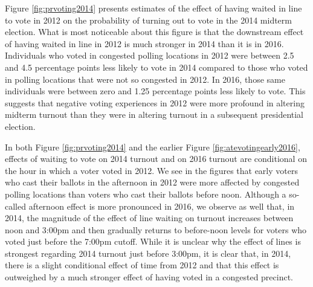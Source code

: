 \documentclass[12pt,titlepage]{article}
\begin{document}
Figure \ref{fig:prvoting2014} presents estimates of the effect of
having waited in line to vote in 2012 on the probability of turning
out to vote in the 2014 midterm election. What is most noticeable
about this figure is that the downstream effect of having waited in
line in 2012 is much stronger in 2014 than it is in 2016. Individuals
who voted in congested polling locations in 2012 were between 2.5 and
4.5 percentage points less likely to vote in 2014 compared to those
who voted in polling locations that were not so congested in 2012. In
2016, those same individuals were between zero and 1.25 percentage
points less likely to vote. This suggests that negative voting
experiences in 2012 were more profound in altering midterm turnout
than they were in altering turnout in a subsequent presidential
election.

In both Figure \ref{fig:prvoting2014} and the earlier Figure
\ref{fig:atevotingearly2016}, effects of waiting to vote on 2014
turnout and on 2016 turnout are conditional on the hour in which a
voter voted in 2012.  We see in the figures that early voters who cast
their ballots in the afternoon in 2012 were more affected by congested
polling locations than voters who cast their ballots before noon.
Although a so-called afternoon effect is more pronounced in 2016, we
observe as well that, in 2014, the magnitude of the effect of line
waiting on turnout increases between noon and 3:00pm and then
gradually returns to before-noon levels for voters who voted just
before the 7:00pm cutoff.  While it is unclear why the effect of lines
is strongest regarding 2014 turnout just before 3:00pm, it is clear
that, in 2014, there is a slight conditional effect of time from 2012
and that this effect is outweighed by a much stronger effect of having
voted in a congested precinct.



\end{document}
